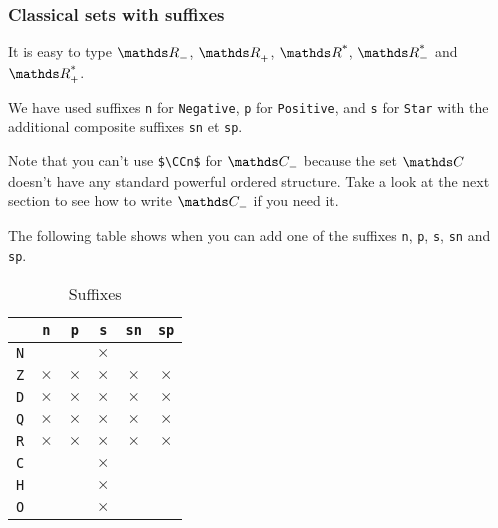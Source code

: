 \documentclass[12pt,a4paper]{article}
\begin{document}
    \subsubsection{Classical sets with suffixes}

\begin{tcblisting}{}
It is easy to type $\RRn$, $\RRp$, $\RRs$, $\RRsn$ and $\RRsp$.
\end{tcblisting}


We have used suffixes \verb+n+ for \verb+Negative+, \verb+p+ for \verb+Positive+, and \verb+s+ for \verb+Star+ with the additional composite suffixes \verb+sn+ et \verb+sp+.

\medskip

Note that you can't use \verb+$\CCn$+ for $\specialset{\CC}{n}$ because the set $\CC$ doesn't have any standard powerful ordered structure. Take a look at the next section to see how to write $\specialset{\CC}{n}$ if you need it.

\medskip

The following table shows when you can add one of the suffixes \verb+n+, \verb+p+, \verb+s+, \verb+sn+ and \verb+sp+.

\newcommand\xx{\phantom{$\times$}}
\begin{table}[h]
    \caption{Suffixes}
    \begin{center}
        \begin{tabular}{c|c|c|c|c|c}
  & \verb+n+ & \verb+p+ & \verb+s+ & \verb+sn+ & \verb+sp+ \\
\hline \verb+N+ & \xx & \xx & $\times$ & \xx & \xx \\
\hline \verb+Z+ & $\times$ & $\times$ & $\times$ & $\times$ & $\times$ \\
\hline \verb+D+ & $\times$ & $\times$ & $\times$ & $\times$ & $\times$ \\
\hline \verb+Q+ & $\times$ & $\times$ & $\times$ & $\times$ & $\times$ \\
\hline \verb+R+ & $\times$ & $\times$ & $\times$ & $\times$ & $\times$ \\
\hline \verb+C+ & \xx & \xx & $\times$ & \xx & \xx \\
\hline \verb+H+ & \xx & \xx & $\times$ & \xx & \xx \\
\hline \verb+O+ & \xx & \xx & $\times$ & \xx & \xx \\
        \end{tabular}
    \end{center}
    \label{default}
\end{table}
\end{document}
